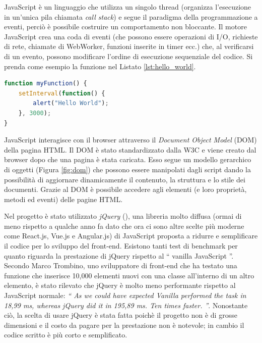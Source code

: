 \documentclass[12pt]{report}
\begin{document}
JavaScript è un linguaggio che utilizza un singolo thread (organizza l'esecuzione in un'unica pila chiamata \emph{call stack}) e segue il paradigma della programmazione a eventi, perciò è possibile costruire un comportamento non bloccante. Il motore JavaScript crea una coda di eventi (che possono essere operazioni di I/O, richieste di rete, chiamate di WebWorker, funzioni inserite in timer ecc.) che, al verificarsi di un evento, possono modificare l'ordine di esecuzione sequenziale del codice. Si prenda come esempio la funzione nel Listato \ref{lst:hello_world}.
\begin{lstlisting}[language=JavaScript, morekeywords={ alert }, caption={Programmazione a eventi: funzione che scrive \textquotedblleft{} Hello World \textquotedblright{} ogni 3 secondi (in questo caso l'evento è rappresentato dal timer)},label={lst:hello_world}]
function myFunction() {
	setInterval(function() { 
		alert("Hello World"); 
	}, 3000);
}
\end{lstlisting}

JavaScript interagisce con il browser attraverso il \emph{Document Object Model} (DOM) della pagina HTML. Il DOM è stato standardizzato dalla W3C e viene creato dal browser dopo che una pagina è stata caricata. Esso segue un modello gerarchico di oggetti (Figura \ref{fig:dom}) che possono essere manipolati dagli script dando la possibilità di aggiornare dinamicamente il contenuto, la struttura e lo stile dei documenti. Grazie al DOM è possibile accedere agli elementi (e loro proprietà, metodi ed eventi) delle pagine HTML.

Nel progetto è stato utilizzato \emph{jQuery} (\cite{jquery}), una libreria molto diffusa (ormai di meno rispetto a qualche anno fa dato che ora ci sono altre scelte più moderne come React.js, Vue.js e Angular.js) di JavaScript proposta a ridurre e semplificare il codice per lo sviluppo del front-end. Esistono tanti test di benchmark per quanto riguarda la prestazione di jQuery rispetto al \textquotedblleft{} vanilla JavaScript \textquotedblright{}. Secondo Marco Trombino, uno sviluppatore di front-end che ha testato una funzione che inserisce 10,000 elementi nuovi con una classe all'interno di un altro elemento, è stato rilevato che jQuery è molto meno performante rispetto al JavaScript normale: \textit{\textquotedblleft{} As we could have expected Vanilla performed the task in 18,99 ms, whereas jQuery did it in 195,89 ms. Ten times faster. \textquotedblright{}}\cite{jquery}. Nonostante ciò, la scelta di usare jQuery è stata fatta poichè il progetto non è di grosse dimensioni e il costo da pagare per la prestazione non è notevole; in cambio il codice scritto è più corto e semplificato. 
\end{document}
